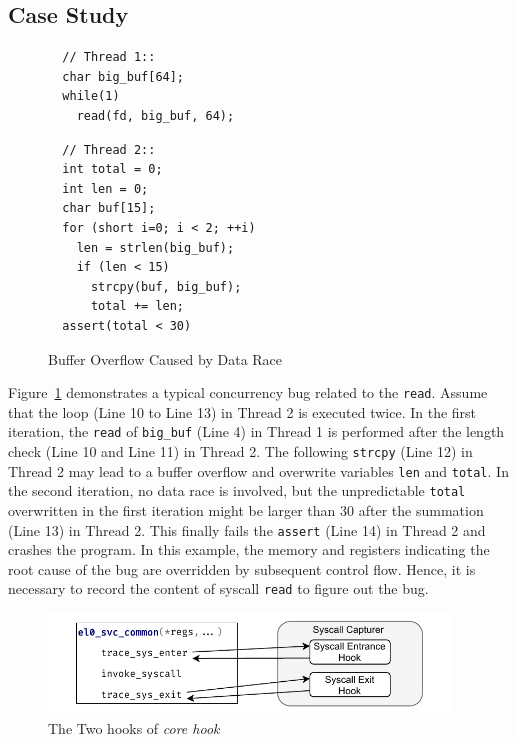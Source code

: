 \subsection{Case Study}

\begin{figure}
    \begin{minipage}[t]{0.46\textwidth}
      \begin{lstlisting}
  // Thread 1::
  char big_buf[64];
  while(1)
    read(fd, big_buf, 64);
      \end{lstlisting}    
    \end{minipage}
    \begin{minipage}[t]{0.46\textwidth}
      \lstset{firstnumber=last}
      \begin{lstlisting}
  // Thread 2::
  int total = 0;
  int len = 0;
  char buf[15];
  for (short i=0; i < 2; ++i)
    len = strlen(big_buf);
    if (len < 15)
      strcpy(buf, big_buf);
      total += len;
  assert(total < 30)
    \end{lstlisting}    
    \end{minipage}
  
  
    \caption{Buffer Overflow Caused by Data Race}
    \label{fig:data-race}
\end{figure}

Figure~\ref{fig:data-race} demonstrates a typical concurrency
bug related to the 
\syscall{} \texttt{read}. Assume that the loop (Line 10 to Line 13) in Thread 2
is executed twice. In the first iteration, the \texttt{read} of 
\texttt{big\_buf} (Line 4) in Thread 1 is performed after the length 
check (Line 10 and Line 11) in Thread 2. The following \texttt{strcpy} (Line 12) in 
Thread 2 may lead to a buffer overflow and overwrite variables \texttt{len} and 
\texttt{total}. In the second iteration, no data race is involved, but the 
unpredictable \texttt{total} overwritten in the first iteration might be larger
than 30 after the summation (Line 13) in Thread 2. This finally fails the
\texttt{assert} (Line 14) in Thread 2 and crashes the program.
In this example, the memory and registers indicating the root cause of
the bug are overridden by subsequent control flow. 
Hence, it is necessary to record the content of syscall \texttt{read} to figure out the bug.


\begin{figure}
    \centering
    \includegraphics[width=0.95\textwidth]{figures/syscall_capturer.pdf}
    \caption{The Two hooks of \textit{core hook}}
    \label{fig:core-hook-desgin}
\end{figure}

